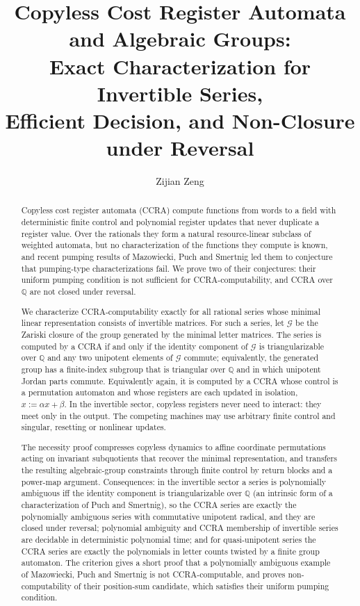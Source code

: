 \documentclass[acmlarge,screen,11pt,nonacm,natbib=false]{acmart}
\title[Copyless Register Automata and Algebraic Groups]{Copyless Cost Register Automata and Algebraic Groups:\texorpdfstring{\\}{ }Exact Characterization for Invertible Series,\texorpdfstring{\\}{ }Efficient Decision, and Non-Closure under Reversal}
\author{Zijian Zeng}
\affiliation{\institution{UCSI University}\country{Malaysia}}
\newcommand{\Q}{\mathbb{Q}}
\newcommand{\cG}{\mathcal{G}}
\theoremstyle{definition}
\begin{document}
\begin{abstract}
\normalsize
Copyless cost register automata (CCRA) compute functions from words to a field with deterministic finite control and polynomial register updates that never duplicate a register value. Over the rationals they form a natural resource-linear subclass of weighted automata, but no characterization of the functions they compute is known, and recent pumping results of Mazowiecki, Puch and Smertnig led them to conjecture that pumping-type characterizations fail. We prove two of their conjectures: their uniform pumping condition is not sufficient for CCRA-computability, and CCRA over $\Q$ are not closed under reversal.

We characterize CCRA-computability exactly for all rational series whose minimal linear representation consists of invertible matrices. For such a series, let $\cG$ be the Zariski closure of the group generated by the minimal letter matrices. The series is computed by a CCRA if and only if the identity component of $\cG$ is triangularizable over $\Q$ and any two unipotent elements of $\cG$ commute; equivalently, the generated group has a finite-index subgroup that is triangular over $\Q$ and in which unipotent Jordan parts commute. Equivalently again, it is computed by a CCRA whose control is a permutation automaton and whose registers are each updated in isolation, $x:=\alpha x+\beta$. In the invertible sector, copyless registers never need to interact: they meet only in the output. The competing machines may use arbitrary finite control and singular, resetting or nonlinear updates.

The necessity proof compresses copyless dynamics to affine coordinate permutations acting on invariant subquotients that recover the minimal representation, and transfers the resulting algebraic-group constraints through finite control by return blocks and a power-map argument. Consequences: in the invertible sector a series is polynomially ambiguous iff the identity component is triangularizable over $\Q$ (an intrinsic form of a characterization of Puch and Smertnig), so the CCRA series are exactly the polynomially ambiguous series with commutative unipotent radical, and they are closed under reversal; polynomial ambiguity and CCRA membership of invertible series are decidable in deterministic polynomial time; and for quasi-unipotent series the CCRA series are exactly the polynomials in letter counts twisted by a finite group automaton. The criterion gives a short proof that a polynomially ambiguous example of Mazowiecki, Puch and Smertnig is not CCRA-computable, and proves non-computability of their position-sum candidate, which satisfies their uniform pumping condition.


\end{abstract}
\end{document}
